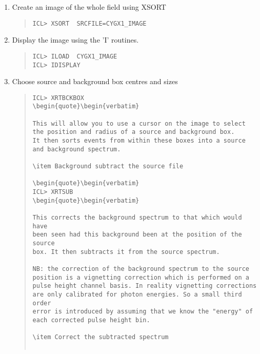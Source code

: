 \documentclass{book}
\renewcommand{\_}{{\tt\char'137}}     %
\begin{document}
\begin{enumerate}
\item Create an image of the whole field using XSORT
\begin{quote}\begin{verbatim}
ICL> XSORT  SRCFILE=CYGX1_IMAGE
\end{verbatim}\end{quote}
\item Display the image using the 'I' routines.
\begin{quote}\begin{verbatim}
ICL> ILOAD  CYGX1_IMAGE
ICL> IDISPLAY
\end{verbatim}\end{quote}
\item Choose source and background box centres and sizes
\begin{quote}\begin{verbatim}
ICL> XRTBCKBOX
\begin{quote}\begin{verbatim}

This will allow you to use a cursor on the image to select
the position and radius of a source and background box.
It then sorts events from within these boxes into a source
and background spectrum.

\item Background subtract the source file

\begin{quote}\begin{verbatim}
ICL> XRTSUB
\begin{quote}\begin{verbatim}

This corrects the background spectrum to that which would have
been seen had this background been at the position of the source
box. It then subtracts it from the source spectrum.

NB: the correction of the background spectrum to the source
position is a vignetting correction which is performed on a
pulse height channel basis. In reality vignetting corrections
are only calibrated for photon energies. So a small third order
error is introduced by assuming that we know the "energy" of
each corrected pulse height bin.

\item Correct the subtracted spectrum


\end{verbatim}
\end{quote}
\end{enumerate}
\end{document}
